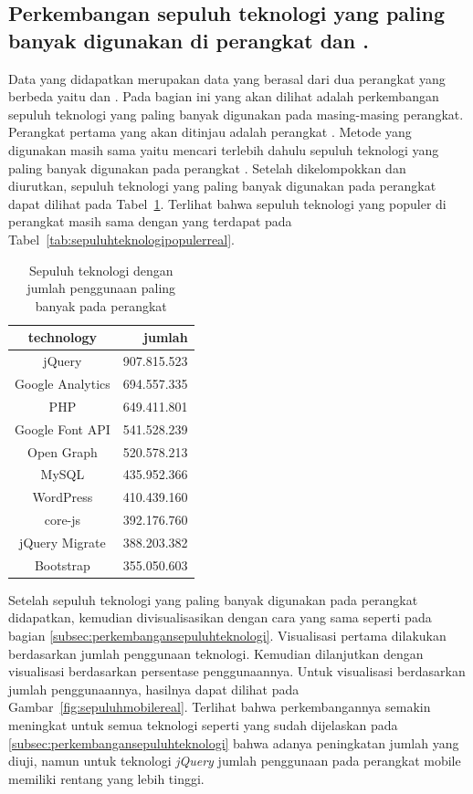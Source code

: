 \subsection{Perkembangan sepuluh teknologi yang paling banyak digunakan di perangkat \desktop dan \mobile.}
\label{subsec:perkembangansepuluhteknologimobile}

Data yang didapatkan merupakan data yang berasal dari dua perangkat yang berbeda yaitu \mobile dan \desktop. Pada bagian ini yang akan dilihat adalah perkembangan sepuluh teknologi yang paling banyak digunakan pada masing-masing perangkat. Perangkat pertama yang akan ditinjau adalah perangkat \mobile. Metode yang digunakan masih sama yaitu mencari terlebih dahulu sepuluh teknologi yang paling banyak digunakan pada perangkat \mobile. Setelah dikelompokkan dan diurutkan, sepuluh teknologi yang paling banyak digunakan pada perangkat \mobile dapat dilihat pada Tabel~\ref{tab:sepuluhteknologimobilereal}. Terlihat bahwa sepuluh teknologi yang populer di perangkat \mobile masih sama dengan yang terdapat pada Tabel~\ref{tab:sepuluhteknologipopulerreal}.

\begin{table}[H]
\centering
\caption{Sepuluh teknologi dengan jumlah penggunaan paling banyak pada perangkat \mobile}
\label{tab:sepuluhteknologimobilereal}
\begin{tabular}{|c|r|}
\hline
technology & jumlah \\ \hline
jQuery & 907.815.523 \\ \hline
Google Analytics & 694.557.335 \\ \hline
PHP & 649.411.801 \\ \hline
Google Font API & 541.528.239 \\ \hline
Open Graph & 520.578.213 \\ \hline
MySQL & 435.952.366 \\ \hline
WordPress & 410.439.160 \\ \hline
core-js & 392.176.760 \\ \hline
jQuery Migrate & 388.203.382 \\ \hline
Bootstrap & 355.050.603 \\ \hline
\end{tabular}
\end{table}

Setelah sepuluh teknologi yang paling banyak digunakan pada perangkat \mobile didapatkan, kemudian divisualisasikan dengan cara yang sama seperti pada bagian \ref{subsec:perkembangansepuluhteknologi}. Visualisasi pertama dilakukan berdasarkan jumlah penggunaan teknologi. Kemudian dilanjutkan dengan visualisasi berdasarkan persentase penggunaannya. Untuk visualisasi berdasarkan jumlah penggunaannya, hasilnya dapat dilihat pada Gambar~\ref{fig:sepuluhmobilereal}. Terlihat bahwa perkembangannya semakin meningkat untuk semua teknologi seperti yang sudah dijelaskan pada \ref{subsec:perkembangansepuluhteknologi} bahwa adanya peningkatan jumlah \web yang diuji, namun untuk teknologi \textit{jQuery} jumlah penggunaan pada perangkat mobile memiliki rentang yang lebih tinggi. 

